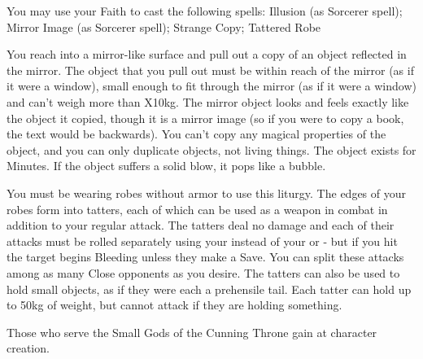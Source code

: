 {

You may use your Faith to cast the following spells: Illusion (as Sorcerer spell); Mirror Image (as Sorcerer spell); Strange Copy; Tattered Robe

\LITURGY [
  Name= Strange Copy,
  Link= king-in-yellow-liturgy-strange-copy,
  Paradigm= Mind ,
  Save=  N ,
  Duration= \SUMDICE Minutes ,
  Counter=  n/a  ,
  Keywords= None ,
  Target=   Close (touch) mirror
]



You reach into a mirror-like surface and pull out a copy of an object reflected in the mirror. The object that you pull out must be within reach of the mirror (as if it were a window), small enough to fit through the mirror (as if it were a window) and can't weigh more than \DICE X10kg. The mirror object looks and feels exactly like the object it copied, though it is a mirror image (so if you were to copy a book, the text would be backwards).  You can't copy any magical properties of the object, and you can only duplicate objects, not living things.  The object exists for \SUMDICE Minutes.  If the object suffers a solid blow, it pops like a bubble.

\LITURGY [
  Name= Tattered Robe,
  Link=king-in-yellow-liturgy-tattered-robe,
  Paradigm= Entropy ,
  Save=  Y (negates Bleeding) ,
  Duration= Combat or \SUMDICE Minutes ,
  Counter=  n/a  ,
  Keywords= None ,
  Target=   Self
]



You must be wearing robes without armor to use this liturgy.  The edges of your robes form into \DICE tatters, each of which can be used as a weapon in combat in addition to your regular attack. The tatters deal no damage and each of their attacks must be rolled separately using your \FOC instead of your \VIG or \DEX - but if you hit the target begins Bleeding unless they make a Save.  You can split these attacks among as many Close opponents as you desire.
The tatters can also be used to hold small objects, as if they were each a prehensile tail.  Each tatter can hold up to 50kg of weight, but cannot attack if they are holding something.

\newpage





Those who serve the Small Gods of the Cunning Throne gain \DCUP \INT at character creation.

}
